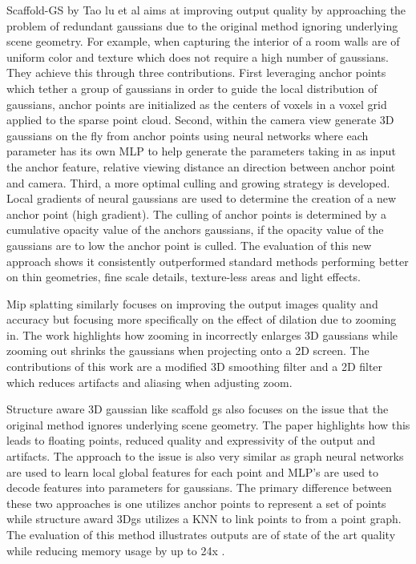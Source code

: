 \documentclass[10pt,twocolumn]{article}
\begin{document}
Scaffold-GS by Tao lu et al aims at improving output quality by approaching the problem of redundant gaussians due to the original method ignoring underlying scene geometry. For example, when capturing the interior of a room walls are of uniform color and texture which does not require a high number of gaussians. They achieve this through three contributions. First leveraging anchor points which tether a group of gaussians in order to guide the local distribution of gaussians, anchor points are initialized as the centers of voxels in a voxel grid applied to the sparse point cloud. Second, within the camera view generate 3D gaussians on the fly from anchor points using neural networks where each parameter has its own MLP to help generate the parameters taking in as input the anchor feature, relative viewing distance an direction between anchor point and camera. Third, a more optimal culling and growing strategy is developed. Local gradients of neural gaussians are used to determine the creation of a new anchor point (high gradient). The culling of anchor points is determined by a cumulative opacity value of the anchors gaussians, if the opacity value of the gaussians are to low the anchor point is culled. The evaluation of this new approach shows it consistently outperformed standard methods performing better on thin geometries, fine scale details, texture-less areas and light effects\cite{lu2023scaffoldgsstructured3dgaussians}.

Mip splatting similarly focuses on improving the output images quality and accuracy but focusing more specifically on the effect of dilation due to zooming in. The work highlights how zooming in incorrectly enlarges 3D gaussians while zooming out shrinks the gaussians when projecting onto a 2D screen. The contributions of this work are a modified 3D smoothing filter and a 2D filter which reduces artifacts and aliasing when adjusting zoom\cite{yu2023mipsplattingaliasfree3dgaussian}.

Structure aware 3D gaussian like scaffold gs also focuses on the issue that the original method ignores underlying scene geometry. The paper highlights how this leads to floating points, reduced quality and expressivity of the output and artifacts. The approach to the issue is also very similar as graph neural networks are used to learn local global features for each point and MLP's are used to decode features into parameters for gaussians. The primary difference between these two approaches is one utilizes anchor points to represent a set of points while structure award 3Dgs utilizes a KNN to link points to from a point graph. The evaluation of this method illustrates outputs are of state of the art quality while reducing memory usage by up to 24x \cite{ververas2024sagsstructureaware3dgaussian}.
\end{document}

